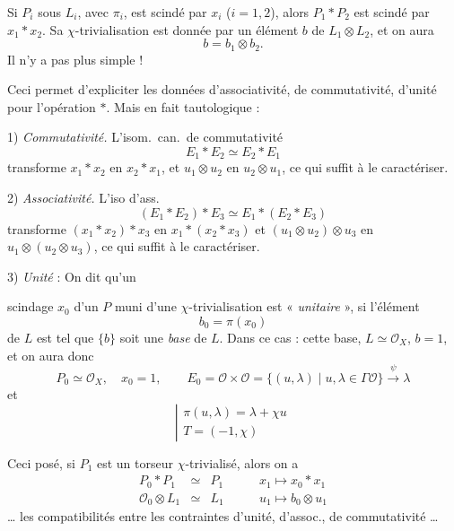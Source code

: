\documentclass[11pt,a4paper]{article}
\begin{document}
Si $P_i$ sous $L_i$, avec $\pi_i$, est scindé par $x_i$ ($i = 1, 2$), alors $P_1 * P_2$ est scindé par $x_1 * x_2$. Sa $\chi$-trivialisation est donnée par un élément $b$ de $L_1 \otimes L_2$, et on aura
\[
  b = b_1 \otimes b_2 .
\]
Il n'y a pas plus simple !

Ceci permet d'expliciter les données d'associativité, de commutativité, d'unité pour l'opération $*$. Mais en fait tautologique :

1) \emph{Commutativité.} L'isom.\ can.\ de commutativité
\[
  E_1 * E_2 \simeq E_2 * E_1
\]
transforme $x_1 * x_2$ en $x_2 * x_1$, et $u_1 \otimes u_2$ en $u_2 \otimes u_1$, ce qui suffit à le caractériser.

2) \emph{Associativité.} L'iso d'ass.
\[
  (E_1 * E_2) * E_3 \simeq E_1 * (E_2 * E_3)
\]
transforme $(x_1 * x_2) * x_3$ en $x_1 * (x_2 * x_3)$ et $(u_1 \otimes u_2) \otimes u_3$ en $u_1 \otimes (u_2 \otimes u_3)$, ce qui suffit à le caractériser.

3) \emph{Unité} : On  dit qu'un

scindage $x_0$ d'un $P$ muni d'une $\chi$-trivialisation est « \emph{unitaire} », si l'élément
\[
  b_0 = \pi(x_0)
\]
de $L$ est tel que \struck{\ill{}} $\{b\}$ soit une \emph{base} de $L$. Dans ce cas : cette base, $L \simeq \mathcal{O}_X$, $b = 1$, et on aura donc
\[
  P_0 \simeq \mathcal{O}_X, \quad x_0 = 1, \qquad
  E_0 = \mathcal{O} \times \mathcal{O} = \{(u, \lambda) \mid u, \lambda \in \Gamma\mathcal{O}\} \xrightarrow{\psi} \lambda
\]
et
\[
  \left|\begin{array}{l}
  \pi(u, \lambda) = \lambda + \chi u \\
  T = (-1, \chi)
  \end{array}\right.
\]

Ceci posé, si $P_1$ est un torseur $\chi$-trivialisé, alors on a
\[
  \begin{array}{rcl}
  P_0 * P_1 & \simeq & P_1 \\
  \mathcal{O}_0 \otimes L_1 & \simeq & L_1
  \end{array}
  \qquad
  \begin{array}{l}
  x_1 \longmapsto x_0 * x_1 \\
  u_1 \longmapsto b_0 \otimes u_1
  \end{array}
\]
… les compatibilités entre les contraintes d'unité, d'assoc., de commutativité …

\end{document}
